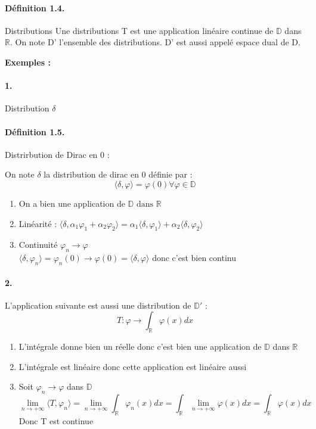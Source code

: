 \documentclass[12pt,a4paper]{report}
\newcommand{\Ens}[1]{\mathbb{#1}}
\newcommand{\ens}[1]{\mathbb{#1}}
\begin{document}
\paragraph{Définition 1.4.} Distributions
Une distributions T est une application linéaire continue de \(\mathbb{D}\) dans \(\mathbb{R}\).
On note D' l'ensemble des distributions. D' est aussi appelé espace dual de D.

\textbf{Exemples :}

\paragraph{1.} Distribution \(\delta\)
\paragraph{Définition 1.5.} Distrirbution de Dirac en 0 :

On note \(\delta\) la distribution de dirac en 0 définie par :
\[
	\langle \delta, \varphi \rangle = \varphi(0) \forall \varphi \in \mathbb{D}
\]

\begin{enumerate}
	\item On a bien une application de \(\mathbb{D} \text{ dans } \mathbb{R}\)
	\item Linéarité : \(\langle \delta, \alpha_1 \varphi_1 + 	\alpha_2 \varphi_2 \rangle = \alpha_1 \langle \delta, \varphi_1 \rangle + \alpha_2 \langle \delta, \varphi_2 \rangle\)
	\item Continuité \(\varphi_n \rightarrow \varphi\)\\
	\(\langle \delta, \varphi_n \rangle = \varphi_n (0) \rightarrow \varphi(0) = \langle \delta, \varphi \rangle\) donc c'est bien continu 
\end{enumerate}

\paragraph{2.} L'application suivante est aussi une distribution de \(\Ens{D}'\) :
\[
	T : \varphi \rightarrow \int_{\Ens{R}} \varphi(x) dx
\]
\begin{enumerate}
	\item L'intégrale donne bien un réelle donc c'est bien une application de \(\Ens{D}\) dans \(\Ens{R}\)
	\item L'intégrale est linéaire donc cette application est linéaire aussi
	\item Soit \(\varphi_n \rightarrow \varphi\) dans \(\Ens{D}\)
	\[
		\lim_{n \rightarrow +\infty} \langle T, \varphi_n \rangle = \lim_{n \rightarrow +\infty} \int_{\ens{R}} \varphi_n (x) dx = \int_{\ens{R}} \lim_{n \rightarrow +\infty} \varphi (x) dx = \int_{\ens{R}} \varphi(x) dx
	\]
	Donc T est continue
\end{enumerate}
\end{document}
